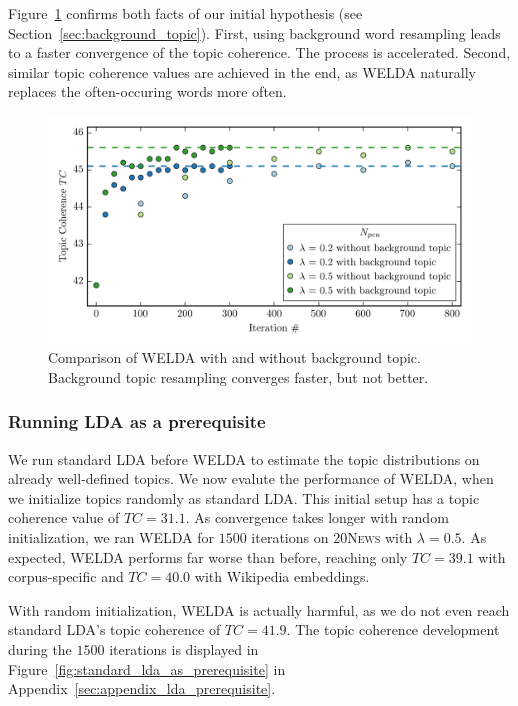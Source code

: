 \documentclass[
        a4paper,
        titlepage,
        twoside,
        parskip,
        numbers=noenddot
        ]{scrbook}
\theoremstyle{break}
\begin{document}
Figure~\ref{fig:welda_gaussian_background_topic} confirms both facts of our initial hypothesis (see Section~\ref{sec:background_topic}).
First, using background word resampling leads to a faster convergence of the topic coherence.
The process is accelerated.
Second, similar topic coherence values are achieved in the end, as WELDA naturally replaces the often-occuring words more often.

\begin{figure}
       \centering
       \includegraphics[width=\textwidth]{figures/welda_gaussian_background_topic.png}
       \caption{Comparison of WELDA with and without background topic. Background topic resampling converges faster, but not better.}
       \label{fig:welda_gaussian_background_topic}
\end{figure}

\subsubsection{Running LDA as a prerequisite}

We run standard LDA before WELDA to estimate the topic distributions on already well-defined topics.
We now evalute the performance of WELDA, when we initialize topics randomly as standard LDA.
This initial setup has a topic coherence value of $TC = 31.1$.
As convergence takes longer with random initialization, we ran WELDA for $1500$ iterations on \textsc{20News} with $\lambda = 0.5$.
As expected, WELDA performs far worse than before, reaching only $TC = 39.1$ with corpus-specific and $TC = 40.0$ with Wikipedia embeddings.



With random initialization, WELDA is actually harmful, as we do not even reach standard LDA's topic coherence of $TC = 41.9$.
The topic coherence development during the $1500$ iterations is displayed in Figure~\ref{fig:standard_lda_as_prerequisite} in Appendix~\ref{sec:appendix_lda_prerequisite}.
\end{document}
